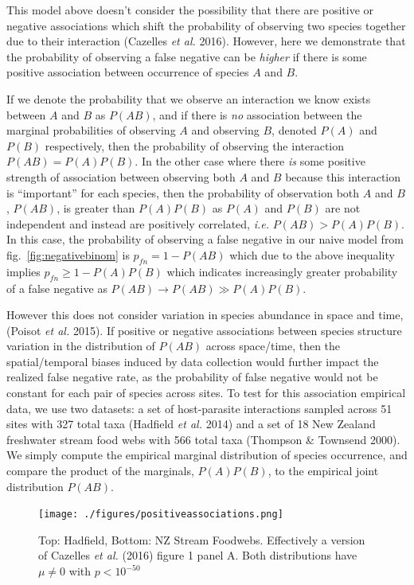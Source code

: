 \documentclass[11pt]{article}
\begin{document}
This model above doesn't consider the possibility that there are
positive or negative associations which shift the probability of
observing two species together due to their interaction (Cazelles
\emph{et al.} 2016). However, here we demonstrate that the probability
of observing a false negative can be \emph{higher} if there is some
positive association between occurrence of species \(A\) and \(B\).

If we denote the probability that we observe an interaction we know
exists between \(A\) and \(B\) as \(P(AB)\), and if there is \emph{no}
association between the marginal probabilities of observing \(A\) and
observing \(B\), denoted \(P(A)\) and \(P(B)\) respectively, then the
probability of observing the interaction \(P(AB) = P(A)P(B)\). In the
other case where there \emph{is} some positive strength of association
between observing both \(A\) and \(B\) because this interaction is
``important'' for each species, then the probability of observation both
\(A\) and \(B\), \(P(AB)\), is greater than \(P(A)P(B)\) as \(P(A)\) and
\(P(B)\) are not independent and instead are positively correlated,
\emph{i.e.} \(P(AB) > P(A)P(B)\). In this case, the probability of
observing a false negative in our naive model from
fig.~\ref{fig:negativebinom} is \(p_{fn} = 1 - P(AB)\) which due to the
above inequality implies \(p_{fn} \geq 1 - P(A)P(B)\) which indicates
increasingly greater probability of a false negative as
\(P(AB) \to P(AB) \gg P(A)P(B)\).

However this does not consider variation in species abundance in space
and time, (Poisot \emph{et al.} 2015). If positive or negative
associations between species structure variation in the distribution of
\(P(AB)\) across space/time, then the spatial/temporal biases induced by
data collection would further impact the realized false negative rate,
as the probability of false negative would not be constant for each pair
of species across sites. To test for this association empirical data, we
use two datasets: a set of host-parasite interactions sampled across 51
sites with 327 total taxa (Hadfield \emph{et al.} 2014) and a set of 18
New Zealand freshwater stream food webs with 566 total taxa (Thompson \&
Townsend 2000). We simply compute the empirical marginal distribution of
species occurrence, and compare the product of the marginals,
\(P(A)P(B)\), to the empirical joint distribution \(P(AB)\).

\begin{figure}
\hypertarget{fig:associations}{%
\centering
\texttt{[image: ./figures/positiveassociations.png]}
\caption{Top: Hadfield, Bottom: NZ Stream Foodwebs. Effectively a
version of Cazelles \emph{et al.} (2016) figure 1 panel A. Both
distributions have \(\mu \neq 0\) with
\(p < 10^{-50}\)}\label{fig:associations}
}
\end{figure}
\end{document}
